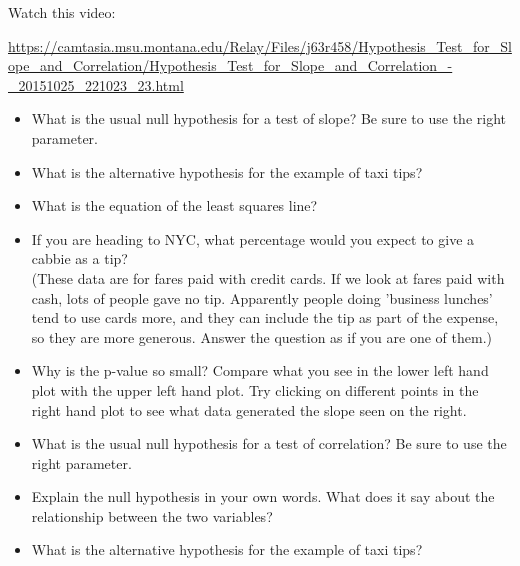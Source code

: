 \def\theTopic{Reading 16}

Watch this video:

\url{https://camtasia.msu.montana.edu/Relay/Files/j63r458/Hypothesis_Test_for_Slope_and_Correlation/Hypothesis_Test_for_Slope_and_Correlation_-_20151025_221023_23.html}


\begin{itemize}
 \item What is the usual null hypothesis for a test of slope? Be sure
   to use the right parameter. \vfill

 \item What is the alternative hypothesis for the example of taxi tips?\vfill

 \item What is the equation of the least squares line?\vfill

 \item If you are heading to NYC, what percentage would you expect to give a
   cabbie as a tip?\\
    (These data are for fares paid with credit cards. If we look at
    fares paid with cash, lots of people gave no tip. Apparently
    people doing 'business lunches' tend to use cards more, and they
    can include the tip as part of the expense, so they are more
    generous.  Answer the question as if you are one of them.) \vfill

  \item Why is the p-value so small?  Compare what you see in the
    lower left hand plot with the upper left hand plot. Try clicking
    on different points in the right hand plot to see what data
    generated the slope seen on the right. \vfill

  \item What is the usual null hypothesis for a test of correlation? Be sure
   to use the right parameter. \vfill
  \item Explain the null hypothesis in your own words.  What does it
    say about the relationship between the two variables?\vfill

  \item What is the alternative hypothesis for the example of taxi tips?\vfill

\end{itemize}

